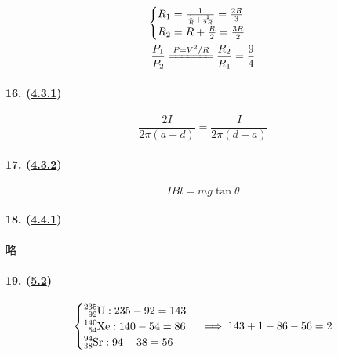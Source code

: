 \begin{gather*}
    \begin{cases}
        R_1=\frac{1}{\frac{1}{R}+\frac{1}{2R}}=\frac{2R}{3}\\
        R_2=R+\frac{R}{2}=\frac{3R}{2}
    \end{cases}\\
    \frac{P_1}{P_2}\xlongequal{P=V^2/R}\frac{R_2}{R_1}=\frac94
\end{gather*}

\paragraph{16. (\hyperref[subsec:4.3.1]{4.3.1})}

\begin{equation*}
    \frac{2I}{2\pi(a-d)}=\frac{I}{2\pi(d+a)}
\end{equation*}

\paragraph{17. (\hyperref[subsec:4.3.2]{4.3.2})}

\begin{equation*}
    IBl=mg\tan\theta
\end{equation*}

\paragraph{18. (\hyperref[subsec:4.4.1]{4.4.1})} 略
\paragraph{19. (\hyperref[sec:5.2]{5.2})}

\begin{equation*}
    \begin{cases}
        \ce{^{235}_{92}U}:235-92=143\\
        \ce{^{140}_{54}Xe}:140-54=86\\
        \ce{^{94}_{38}Sr}:94-38=56
    \end{cases}\implies 143+1-86-56=2
\end{equation*}
